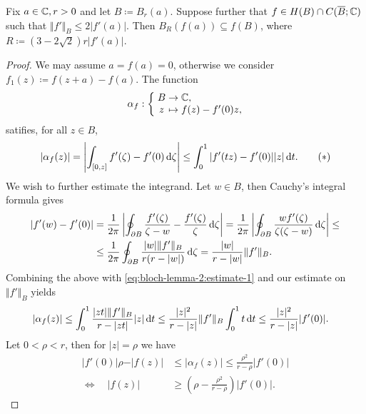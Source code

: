 \begin{lemma} \label{lem:bloch-lemma-2}
    Fix $a \in \mathbb{C}, r > 0$ and let $B \coloneqq B_{r}(a)$. Suppose further that $f \in H(B) \cap C(\overline{B}; \mathbb{C})$ such that $\Vert f' \Vert_B \leq 2 \vert f'(a) \vert$. Then $ B_{R}(f(a)) \subseteq f(B)$, where $ R \coloneqq (3 - 2 \sqrt{2}) r \vert f'(a) \vert $.
\end{lemma}

\begin{proof}
    We may assume $a = f(a) = 0$, otherwise we consider $f_1(z) \coloneqq f(z + a) - f(a)$. The function
    $$ \mapping{\alpha_f}{B & \to & \C,}{z & \mapsto & f(z) - f'(0) z,} $$
    satifies, for all $z \in B$,
    \begin{equation} \label{eq:bloch-lemma-2:estimate-1}
        \vert \alpha_f(z) \vert = \left\vert \int_{[0, z]} f'(\zeta) - f'(0) \mathop{}\!\mathrm{d} \zeta \right\vert \leq \int_0^1 \vert f'(t z) - f'(0) \vert \vert z \vert \mathop{}\!\mathrm{d} t. \tag{\textasteriskcentered}
    \end{equation}
    We wish to further estimate the integrand. Let $w \in B$, then Cauchy's integral formula gives
    \begin{align*}
        \vert f'(w) - f'(0) \vert &= \frac{1}{2\pi} \left\vert \oint_{\partial B} \frac{f'(\zeta)}{\zeta - w} - \frac{f'(\zeta)}{\zeta} \mathop{}\!\mathrm{d} \zeta \right\vert = \frac{1}{2\pi} \left\vert \oint_{\partial B} \frac{w f'(\zeta)}{\zeta (\zeta - w)} \mathop{}\!\mathrm{d} \zeta \right\vert \leq \\
        &\leq \frac{1}{2\pi} \oint_{\partial B} \frac{\vert w \vert \Vert f' \Vert_B}{r(r - \vert w \vert)} \mathop{}\!\mathrm{d} \zeta = \frac{\vert w \vert}{r - \vert w \vert} \Vert f' \Vert_B.
    \end{align*}
    Combining the above with \eqref{eq:bloch-lemma-2:estimate-1} and our estimate on $\Vert f' \Vert_B$ yields
    \begin{align*}
        \vert \alpha_f(z) \vert &\leq \int_0^1 \frac{\vert z t \vert \Vert f' \Vert_B}{r - \vert z t \vert} \vert z \vert \mathop{}\!\mathrm{d} t \leq \frac{\vert z \vert^2}{r - \vert z \vert} \Vert f' \Vert_B \int_0^1 t \mathop{}\!\mathrm{d} t \leq \frac{\vert z \vert^2}{r - \vert z \vert} \vert f'(0) \vert.
    \end{align*}
    Let $0 < \rho < r$, then for $\vert z \vert = \rho$ we have
    \begin{align*}
        \vert f'(0) \vert \rho - \vert f(z) \vert &\leq \vert \alpha_f(z) \vert \leq \frac{\rho^2}{r - \rho} \vert f'(0) \vert \\
        \Longleftrightarrow \quad \vert f(z) \vert &\geq \left( \rho - \frac{\rho^2}{r - \rho} \right) \vert f'(0) \vert.

\end{align*}
\end{proof}
